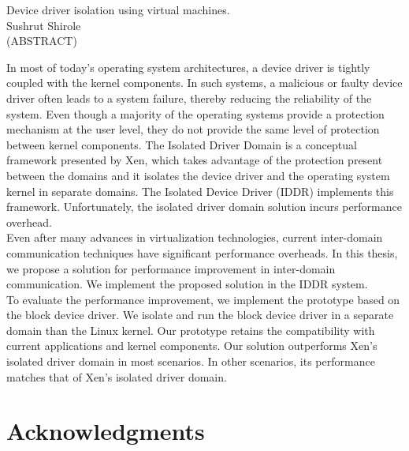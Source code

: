 \documentclass[12pt]{report}
\begin{document}
\thispagestyle{empty}
\begin{center}

{\large 
Device driver isolation using virtual machines.
}
\\[8mm]
Sushrut Shirole
\\[8mm]
(ABSTRACT)
\\[10mm]
\end{center}
In most of today's operating system architectures, a device driver is tightly coupled with the kernel components. In such systems, a malicious or faulty device driver often leads to a system failure, thereby reducing the reliability of the system. Even though a majority of the operating systems provide a protection mechanism at the user level, they do not provide the same level of protection between kernel components. The Isolated Driver Domain is a conceptual framework presented by Xen, which takes advantage of the protection present between the domains and it isolates the device driver and the operating system kernel in separate domains. The Isolated Device Driver (IDDR) implements this framework. Unfortunately, the isolated driver domain solution incurs performance overhead. 
\\[3mm]
Even after many advances in virtualization technologies, current inter-domain communication techniques have significant performance overheads. In this thesis, we propose a solution for performance improvement in inter-domain communication. We implement the proposed solution in the IDDR system. 
\\[3mm]
To evaluate the performance improvement, we implement the prototype based on the block device driver. We isolate and run the block device driver in a separate domain than the Linux kernel. Our prototype retains the compatibility with current applications and kernel components. Our solution outperforms Xen's isolated driver domain in most scenarios. In other scenarios, its performance matches that of Xen's isolated driver domain. 
\vfill

\pagebreak

\chapter*{Acknowledgments}


\tableofcontents
\pagebreak

\listoffigures
\pagebreak

\listoftables
\pagebreak

\pagestyle{myheadings}
\end{document}
